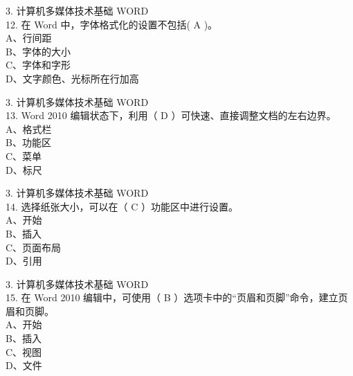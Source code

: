 \documentclass[aspectratio=169]{beamer}
\begin{document}
\begin{frame}[t]{3. 计算机多媒体技术基础} \vspace{20pt}
    WORD\\
12. 在 Word 中，字体格式化的设置不包括( A )。\\
A、行间距\\ B、字体的大小\\ C、字体和字形\\ D、文字颜色、光标所在行加高\\
\end{frame}



\begin{frame}[t]{3. 计算机多媒体技术基础} \vspace{20pt}
    WORD\\

13. Word 2010 编辑状态下，利用（ D ）可快速、直接调整文档的左右边界。
A、格式栏\\ B、功能区\\ C、菜单\\ D、标尺\\
\end{frame}


\begin{frame}[t]{3. 计算机多媒体技术基础} \vspace{20pt}
    WORD\\

14. 选择纸张大小，可以在（ C ）功能区中进行设置。\\
A、开始\\ B、插入\\ C、页面布局\\ D、引用\\
\end{frame}


\begin{frame}[t]{3. 计算机多媒体技术基础} \vspace{20pt}
    WORD\\

15. 在 Word 2010 编辑中，可使用（ B ）选项卡中的“页眉和页脚”命令，建立页眉和页脚。\\
A、开始\\ B、插入\\ C、视图\\ D、文件\\
\end{frame}
\end{document}
